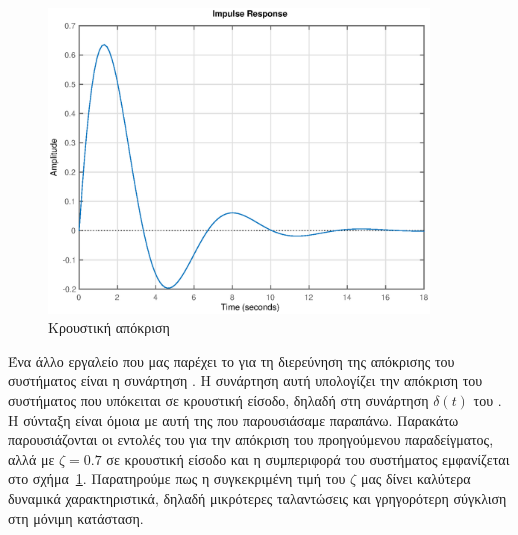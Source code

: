 \begin{figure}[h!]
    \centering
    \includegraphics[width=0.9\textwidth]{figures/prelim6.eps}
    \caption{Κρουστική απόκριση}
    \label{fig:prelim6}
\end{figure}
Ένα άλλο εργαλείο που μας παρέχει το  για τη διερεύνηση της απόκρισης
του συστήματος είναι η συνάρτηση . Η συνάρτηση αυτή υπολογίζει την
απόκριση του συστήματος που υπόκειται σε κρουστική είσοδο, δηλαδή στη συνάρτηση
\( \delta(t) \) του . Η σύνταξη είναι όμοια με αυτή της 
που παρουσιάσαμε παραπάνω. Παρακάτω παρουσιάζονται οι εντολές του 
για την απόκριση του προηγούμενου παραδείγματος, αλλά με \( \zeta = 0.7 \)
σε κρουστική είσοδο και η συμπεριφορά του συστήματος εμφανίζεται στο
σχήμα~\ref{fig:prelim6}. Παρατηρούμε πως η συγκεκριμένη τιμή του \( \zeta \) μας
δίνει καλύτερα δυναμικά χαρακτηριστικά, δηλαδή μικρότερες ταλαντώσεις και
γρηγορότερη σύγκλιση στη μόνιμη κατάσταση.
\eng{}

